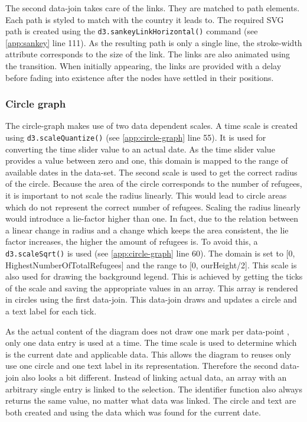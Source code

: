 The second data-join takes care of the links. They are matched to path elements. Each path is styled to match with the country it leads to. The required SVG path is created using the \texttt{d3.sankeyLinkHorizontal()} command (see \ref{app:sankey} line 111). As the resulting path is only a single line, the stroke-width attribute corresponds to the size of the link. The links are also animated using the transition. When initially appearing, the links are provided with a delay before fading into existence after the nodes have settled in their positions.

\subsubsection{Circle graph}

The circle-graph makes use of two data dependent scales. A time scale is created using \texttt{d3.scaleQuantize()} (see \ref{app:circle-graph} line 55). It is used for converting the time slider value to an actual date. As the time slider value provides a value between zero and one, this domain is mapped to the range of available dates in the data-set. The second scale is used to get the correct radius of the circle. Because the area of the circle corresponds to the number of refugees, it is important to not scale the radius linearly. This would lead to circle areas which do not represent the correct number of refugees. Scaling the radius linearly would introduce a lie-factor higher than one. In fact, due to the relation between a linear change in radius and a change which keeps the area consistent, the lie factor increases, the higher the amount of refugees is. To avoid this, a \texttt{d3.scaleSqrt()} is used (see \ref{app:circle-graph} line 60). The domain is set to [0, HighestNumberOfTotalRefugees] and the range to [0, ourHeight/2]. This scale is also used for drawing the background legend. This is achieved by getting the ticks of the scale and saving the appropriate values in an array. This array is rendered in circles using the first data-join. This data-join draws and updates a circle and a text label for each tick.


As the actual content of the diagram does not draw one mark per data-point , only one data entry is used at a time. The time scale is used to determine which is the current date and applicable data. This allows the diagram to reuses only use one circle and one text label in its representation. Therefore the second data-join also looks a bit different. Instead of linking actual data, an array with an arbitrary single entry is linked to the selection. The identifier function also always returns the same value, no matter what data was linked. The circle and text are both created and using the data which was found for the current date.



